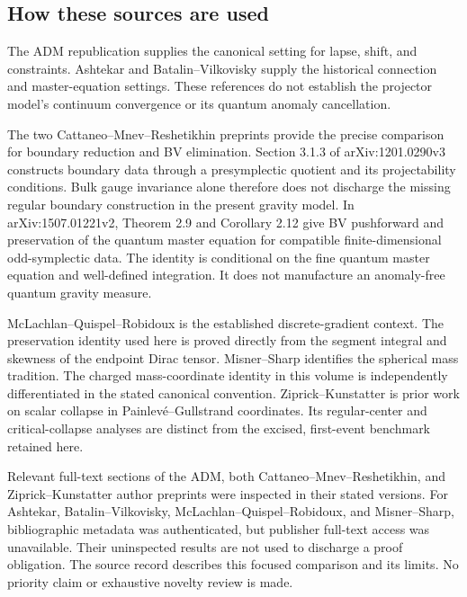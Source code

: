 \subsection*{How these sources are used}
The ADM republication supplies the canonical setting for lapse, shift, and constraints. Ashtekar and Batalin--Vilkovisky supply the historical connection and master-equation settings. These references do not establish the projector model's continuum convergence or its quantum anomaly cancellation.

The two Cattaneo--Mnev--Reshetikhin preprints provide the precise comparison for boundary reduction and BV elimination. Section 3.1.3 of arXiv:1201.0290v3 constructs boundary data through a presymplectic quotient and its projectability conditions. Bulk gauge invariance alone therefore does not discharge the missing regular boundary construction in the present gravity model. In arXiv:1507.01221v2, Theorem 2.9 and Corollary 2.12 give BV pushforward and preservation of the quantum master equation for compatible finite-dimensional odd-symplectic data. The identity is conditional on the fine quantum master equation and well-defined integration. It does not manufacture an anomaly-free quantum gravity measure.

McLachlan--Quispel--Robidoux is the established discrete-gradient context. The preservation identity used here is proved directly from the segment integral and skewness of the endpoint Dirac tensor. Misner--Sharp identifies the spherical mass tradition. The charged mass-coordinate identity in this volume is independently differentiated in the stated canonical convention. Ziprick--Kunstatter is prior work on scalar collapse in Painlev\'e--Gullstrand coordinates. Its regular-center and critical-collapse analyses are distinct from the excised, first-event benchmark retained here.

Relevant full-text sections of the ADM, both Cattaneo--Mnev--Reshetikhin, and Ziprick--Kunstatter author preprints were inspected in their stated versions. For Ashtekar, Batalin--Vilkovisky, McLachlan--Quispel--Robidoux, and Misner--Sharp, bibliographic metadata was authenticated, but publisher full-text access was unavailable. Their uninspected results are not used to discharge a proof obligation. The source record describes this focused comparison and its limits. No priority claim or exhaustive novelty review is made.

\endgroup
